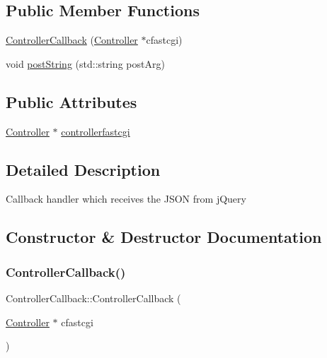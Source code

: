 \subsection*{Public Member Functions}
\begin{DoxyCompactItemize}
\item 
\hyperlink{classControllerCallback_ad09e33e9c4725df642ca098364737a84}{Controller\+Callback} (\hyperlink{classController}{Controller} $\ast$cfastcgi)
\item 
void \hyperlink{classControllerCallback_aa7aa4c4c12ced1395e8c40ed1b82db12}{post\+String} (std\+::string post\+Arg)
\end{DoxyCompactItemize}
\subsection*{Public Attributes}
\begin{DoxyCompactItemize}
\item 
\hyperlink{classController}{Controller} $\ast$ \hyperlink{classControllerCallback_a0992380f69e00cdb841e291d3d447cd5}{controllerfastcgi}
\end{DoxyCompactItemize}


\subsection{Detailed Description}
Callback handler which receives the J\+S\+ON from j\+Query 

\subsection{Constructor \& Destructor Documentation}
\mbox{\label{classControllerCallback_ad09e33e9c4725df642ca098364737a84}} 
\subsubsection{\texorpdfstring{Controller\+Callback()}{ControllerCallback()}}
{\footnotesize\ttfamily Controller\+Callback\+::\+Controller\+Callback (\begin{DoxyParamCaption}\item[{\hyperlink{classController}{Controller} $\ast$}]{cfastcgi }\end{DoxyParamCaption})\hspace{0.3cm}{\ttfamily [inline]}}



